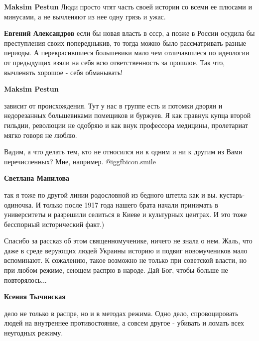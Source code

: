 \begin{itemize}
\begin{itemize}
\begin{itemize}
\end{itemize} %

\textbf{Maksim Pestun} Люди просто чтят часть своей истории со всеми ее плюсами
и минусами, а не вычленяют из нее одну грязь и ужас.

\begin{itemize} %
\textbf{Евгений Александров} если бы новая власть в ссср, а позже в России осудила бы преступления своих попередныкив, то тогда можно было рассматривать разные периоды. А перекрасившиеся большевики мало чем отличавшиеся по идеологии от предыдущих взяли на себя всю ответственность за прошлое. Так что, вычленять хорошое - себя обманывать!
\end{itemize} %

\textbf{Maksim Pestun} 

зависит от происхождения. Тут у нас в группе есть и потомки дворян и
недорезанных большевиками помещиков и буржуев. Я как правнук купца второй
гильдии, революции не одобряю и как внук профессора медицины, пролетариат мягко
говоря не люблю.

\begin{itemize} %
Вадим, а что делать тем, кто не относился ни к одним и ни к другим из Вами перечисленных? Мне, например. @igg{fbicon.smile} 

\textbf{Светлана Манилова} 

так я тоже по другой линии родословной из бедного штетла как и вы.
кустарь-одиночка. И только после 1917 года нашего брата начали принимать в
университеты и разрешили селиться в Киеве и культурных центрах. И это тоже
бесспорный исторический факт.)

\end{itemize} %


\end{itemize} %


Спасибо за рассказ об этом священномученике, ничего не знала о нем. Жаль, что
даже в среде верующих людей Украины историю и подвиг новомучеников мало
вспоминают. К сожалению, такое возможно не только при советской власти, но при
любом режиме, сеющем распрю в народе. Дай Бог, чтобы больше не повторялось...

\begin{itemize} %
\textbf{Ксения Тычинская} 

дело не только в распре, но и в методах режима. Одно дело, спровоцировать людей
на внутреннее противостояние, а совсем другое - убивать и ломать всех неугодных
режиму.


\end{itemize}
\end{itemize}
